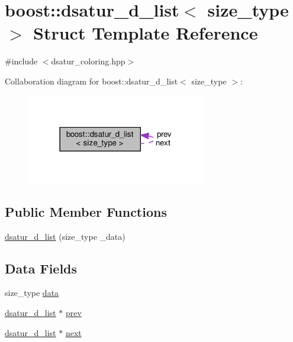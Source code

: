 \hypertarget{structboost_1_1dsatur__d__list}{}\section{boost\+:\+:dsatur\+\_\+d\+\_\+list$<$ size\+\_\+type $>$ Struct Template Reference}
\label{structboost_1_1dsatur__d__list}


{\ttfamily \#include $<$dsatur\+\_\+coloring.\+hpp$>$}



Collaboration diagram for boost\+:\+:dsatur\+\_\+d\+\_\+list$<$ size\+\_\+type $>$\+:
\nopagebreak
\begin{figure}[H]
\begin{center}
\leavevmode
\includegraphics[width=222pt]{d2/da1/structboost_1_1dsatur__d__list__coll__graph}
\end{center}
\end{figure}
\subsection*{Public Member Functions}
\begin{DoxyCompactItemize}
\item 
\hyperlink{structboost_1_1dsatur__d__list_a04a20e33fc873adefc9193ef99d71d39}{dsatur\+\_\+d\+\_\+list} (size\+\_\+type \+\_\+data)
\end{DoxyCompactItemize}
\subsection*{Data Fields}
\begin{DoxyCompactItemize}
\item 
size\+\_\+type \hyperlink{structboost_1_1dsatur__d__list_afd5ecbab8d365a7b731f627268f68e5c}{data}
\item 
\hyperlink{structboost_1_1dsatur__d__list}{dsatur\+\_\+d\+\_\+list} $\ast$ \hyperlink{structboost_1_1dsatur__d__list_a809fd0812c52eb6861250b6f7e4d2f92}{prev}
\item 
\hyperlink{structboost_1_1dsatur__d__list}{dsatur\+\_\+d\+\_\+list} $\ast$ \hyperlink{structboost_1_1dsatur__d__list_a2c754a7fd844b9b893ecf34ef428f5ac}{next}
\end{DoxyCompactItemize}


